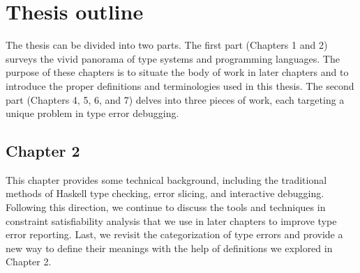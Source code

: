 







\section{Thesis outline}

The thesis can be divided into two parts. The first part (Chapters 1 and 2) surveys the vivid panorama of type systems and programming languages. The purpose of these chapters is to situate the body of work in later chapters and to introduce the proper definitions and terminologies used in this thesis.  The second part (Chapters 4, 5, 6, and 7) delves into three pieces of work, each targeting a unique problem in type error debugging.


\subsection{Chapter 2}
This chapter provides some technical background, including the traditional methods of Haskell type checking, error slicing, and interactive debugging. Following this direction, we continue to discuss the tools and techniques in constraint satisfiability analysis that we use in later chapters to improve type error reporting. Last, we revisit the categorization of type errors and provide a new way to define their meanings with the help of definitions we explored in Chapter 2.


